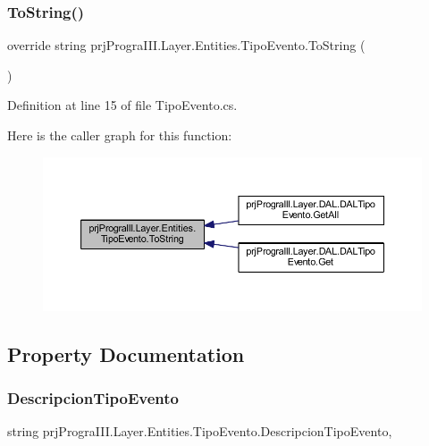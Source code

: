 \subsubsection{\texorpdfstring{To\+String()}{ToString()}}
{\footnotesize\ttfamily override string prj\+Progra\+I\+I\+I.\+Layer.\+Entities.\+Tipo\+Evento.\+To\+String (\begin{DoxyParamCaption}{ }\end{DoxyParamCaption})}



Definition at line 15 of file Tipo\+Evento.\+cs.

Here is the caller graph for this function\+:
\nopagebreak
\begin{figure}[H]
\begin{center}
\leavevmode
\includegraphics[width=350pt]{classprj_progra_i_i_i_1_1_layer_1_1_entities_1_1_tipo_evento_a3e7ec488bca13952e121db2494a85f15_icgraph}
\end{center}
\end{figure}


\subsection{Property Documentation}
\hypertarget{classprj_progra_i_i_i_1_1_layer_1_1_entities_1_1_tipo_evento_a89828d2eb30a4ea3ee17a74ac719a339}{}\label{classprj_progra_i_i_i_1_1_layer_1_1_entities_1_1_tipo_evento_a89828d2eb30a4ea3ee17a74ac719a339} 
\subsubsection{\texorpdfstring{Descripcion\+Tipo\+Evento}{DescripcionTipoEvento}}
{\footnotesize\ttfamily string prj\+Progra\+I\+I\+I.\+Layer.\+Entities.\+Tipo\+Evento.\+Descripcion\+Tipo\+Evento\hspace{0.3cm}{\ttfamily [get]}, {\ttfamily [set]}}



